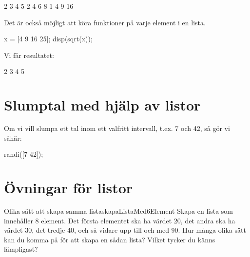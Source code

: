 \vspace{10pt}
\begin{matlab}
  2 3 4 5
  2 4 6 8
  1 4 9 16
\end{matlab}

\newpage
Det är också möjligt att köra funktioner på varje element i en lista.

\begin{matlab}[caption={Köra funktioner på varje element i en lista},label={}]
x = [4 9 16 25];
disp(sqrt(x));
\end{matlab}

Vi får resultatet:

\vspace{10pt}
\begin{matlab}
2 3 4 5
\end{matlab}

\section{Slumptal med hjälp av listor}\label{sec:listorslumptal}
Om vi vill slumpa ett tal inom ett valfritt intervall, t.ex. 7 och 42, så gör vi såhär:

\vspace{10pt}
\begin{matlab}
randi([7 42]); %
\end{matlab}


\section{Övningar för listor}

\begin{matteovning}{Olika sätt att skapa samma lista}{skapaListaMed6Element}
Skapa en lista som innehåller 8 element. Det första elementet ska ha värdet 20, det andra ska ha värdet 30, det tredje 40, och så vidare upp till och med 90. Hur många olika sätt kan du komma på för att skapa en sådan lista? Vilket tycker du känns lämpligast?
\end{matteovning}


